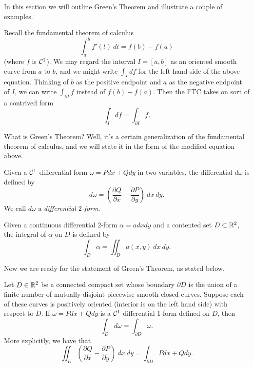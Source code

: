 In this section we will outline Green's Theorem and illustrate a couple of examples.

Recall the fundamental theorem of calculus
\[\int_a^bf'(t)~dt = f(b) - f(a)\]
(where $f$ is $\mathcal{C}^{1}$). We may regard the interval $I = [a, b]$ as an oriented smooth curve from $a$ to $b$, and we might write $\int_Idf$ for the left hand side of the above equation. Thinking of $b$ as the positive endpoint and $a$ as the negative endpoint of $I$, we can write $\int_{\partial I}f$ instead of $f(b) - f(a)$. Then the FTC takes on sort of a contrived form
\[\int_Idf = \int_{\partial I}f.\]

What is Green's Theorem? Well, it's a certain generalization of the fundamental theorem of calculus, and we will state it in the form of the modified equation above.

\begin{definition}
Given a $\mathcal{C}^{1}$ differential form $\omega = Pdx + Qdy$ in two variables, the differential $d\omega$ is defined by 
\[d\omega = \left(\frac{\partial Q}{\partial x} - \frac{\partial P}{\partial y}\right)~dx~dy.\] We call $d\omega$ a \textit{differential $2$-form}.
\end{definition}

\begin{definition}
Given a continuous differential $2$-form $\alpha = adxdy$ and a contented set $D \subset \mathbb{R}^2$, the integral of $\alpha$ on $D$ is defined by 
\[\int_D\alpha = \iint_D a(x, y)~dx~dy.\]
\end{definition}

Now we are ready for the statement of Green's Theorem, as stated below.

\begin{theorem}
Let $D \in \mathbb{R}^2$ be a connected compact set whose boundary $\partial D$ is the union of a finite number of mutually disjoint piecewise-smooth closed curves. Suppose each of these curves is positively oriented (interior is on the left hand side) with respect to $D$. If $\omega = Pdx + Qdy$ is a $\mathcal{C}^{1}$ differential $1$-form defined on $D$, then 
\[\int_Dd\omega = \int_{\partial D}\omega.\]
More explicitly, we have that
\[\iint_D\left(\frac{\partial Q}{\partial x} - \frac{\partial P}{\partial y}\right)~dx~dy = \int_{\partial D}Pdx + Qdy.\]
\end{theorem}
